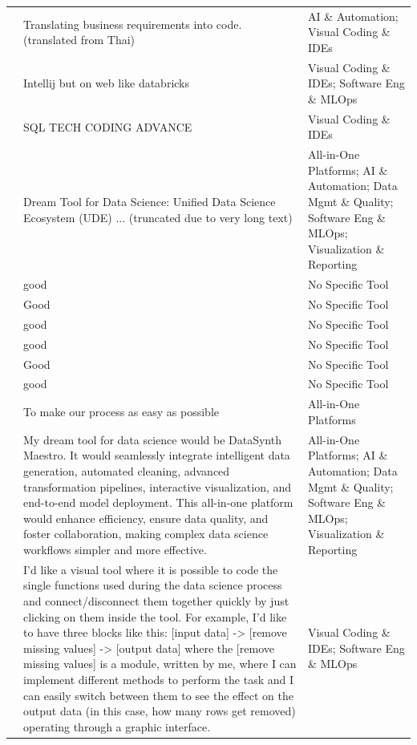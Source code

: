 \documentclass[11pt]{article}
\begin{document}
\begin{longtable}{l p{8.5cm} p{4.5cm}}
\addlinespace
28 & Translating business requirements into code. (translated from Thai) & AI \& Automation; Visual Coding \& IDEs \\
\addlinespace
29 & Intellij but on web like databricks & Visual Coding \& IDEs; Software Eng \& MLOps \\
\addlinespace
30 & SQL TECH CODING ADVANCE & Visual Coding \& IDEs \\
\addlinespace
31 & Dream Tool for Data Science: Unified Data Science Ecosystem (UDE) ... (truncated due to very long text) & All-in-One Platforms; AI \& Automation; Data Mgmt \& Quality; Software Eng \& MLOps; Visualization \& Reporting \\
\addlinespace
32 & good & No Specific Tool \\
\addlinespace
33 & Good & No Specific Tool \\
\addlinespace
34 & good & No Specific Tool \\
\addlinespace
35 & good & No Specific Tool \\
\addlinespace
36 & Good & No Specific Tool \\
\addlinespace
37 & good & No Specific Tool \\
\addlinespace
38 & To make our process as easy as possible & All-in-One Platforms \\
\addlinespace
39 & My dream tool for data science would be DataSynth Maestro. It would seamlessly integrate intelligent data generation, automated cleaning, advanced transformation pipelines, interactive visualization, and end-to-end model deployment. This all-in-one platform would enhance efficiency, ensure data quality, and foster collaboration, making complex data science workflows simpler and more effective. & All-in-One Platforms; AI \& Automation; Data Mgmt \& Quality; Software Eng \& MLOps; Visualization \& Reporting \\
\addlinespace
40 & I'd like a visual tool where it is possible to code the single functions used during the data science process and connect/disconnect them together quickly by just clicking on them inside the tool. For example, I'd like to have three blocks like this: [input data] -\textgreater{} [remove missing values] -\textgreater{} [output data] where the [remove missing values] is a module, written by me, where I can implement different methods to perform the task and I can easily switch between them to see the effect on the output data (in this case, how many rows get removed) operating through a graphic interface. & Visual Coding \& IDEs; Software Eng \& MLOps \\

\end{longtable}
\end{document}
